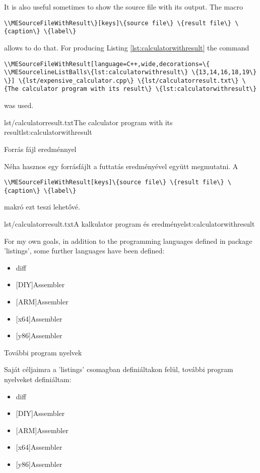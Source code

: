 {
It is also useful sometimes to show the source file with its output.
The macro 
\par\noindent\lstinline|\\MESourceFileWithResult\}[keys]\{source file\} \{result file\} \{caption\} \{label\}|
\par\noindent allows to do that. For producing Listing \ref{lst:calculatorwithresult}
the command 
\par\noindent\lstinline|\\MESourceFileWithResult[language=C++,wide,decorations=\{
	\\MESourcelineListBalls\{lst:calculatorwithresult\} \{13,14,16,18,19\}
\}] \{lst/expensive_calculator.cpp\}
\{lst/calculatorresult.txt\} \{The calculator program with its result\} \{lst:calculatorwithresult\}|
\par\noindent was used.

{lst/calculatorresult.txt}{The calculator program with its result}{lst:calculatorwithresult}


}
{Forrás fájl eredménnyel}
{
Néha hasznos egy forrásfájlt a futtatás eredményével együtt megmutatni.
A
\par\noindent\lstinline|\\MESourceFileWithResult[keys]\{source file\} \{result file\} \{caption\} \{label\}|
\par\noindent makró ezt teszi lehetővé.

{lst/calculatorresult.txt}{A kalkulator program és eredménye}{lst:calculatorwithresult}
}


{ For my own goals, in addition to the programming languages
defined in package 'listings', some further languages
have been defined:
\begin{itemize}
\item diff
\item {[DIY]Assembler}
\item {[ARM]Assembler}
\item {[x64]Assembler}
\item {[y86]Assembler}
\end{itemize}
}
{További program nyelvek}
{
Saját céljaimra a 'listings' csomagban definiáltakon felül,
további program nyelveket definiáltam:
\begin{itemize}
\item diff
\item {[DIY]Assembler}
\item {[ARM]Assembler}
\item {[x64]Assembler}
\item {[y86]Assembler}
\end{itemize}
}